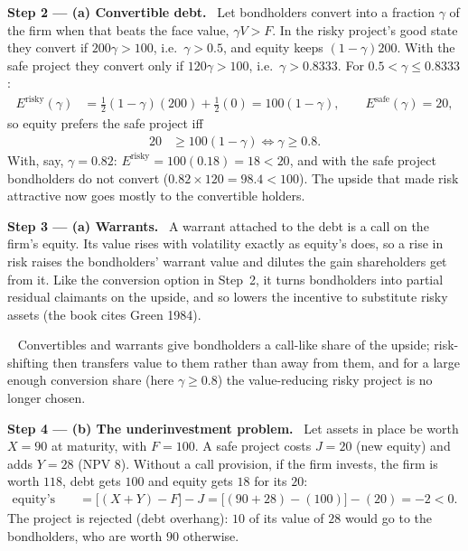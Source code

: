 \documentclass[11pt,a4paper]{article}
\newcommand{\step}[2]{\par\medskip\noindent\textbf{Step #1 --- #2.}~}
\newcommand{\answer}[1]{\par\smallskip\noindent\fbox{\textbf{Answer #1.}}~}
\begin{document}
\step{2}{(a) Convertible debt} Let bondholders convert into a fraction $\gamma$ of the firm when that beats the face value, $\gamma V>F$. In the risky project's good state they convert if $200\gamma>100$, i.e.\ $\gamma>0.5$, and equity keeps $(1-\gamma)200$. With the safe project they convert only if $120\gamma>100$, i.e.\ $\gamma>0.8333$. For $0.5<\gamma\le 0.8333$:
\begin{align}
  E^{\text{risky}}(\gamma) &= \tfrac12(1-\gamma)(200) + \tfrac12(0) = 100(1-\gamma), \qquad E^{\text{safe}}(\gamma) = 20, \nonumber
\end{align}
so equity prefers the safe project iff
\begin{align}
  20 &\ge 100(1-\gamma) \iff \gamma \ge 0.8. \label{r7e3-gamma}
\end{align}
With, say, $\gamma=0.82$: $E^{\text{risky}}=100(0.18)=18<20$, and with the safe project bondholders do not convert ($0.82\times120=98.4<100$). The upside that made risk attractive now goes mostly to the convertible holders.

\step{3}{(a) Warrants} A warrant attached to the debt is a call on the firm's equity. Its value rises with volatility exactly as equity's does, so a rise in risk raises the bondholders' warrant value and dilutes the gain shareholders get from it. Like the conversion option in Step~2, it turns bondholders into partial residual claimants on the upside, and so lowers the incentive to substitute risky assets (the book cites Green 1984).
\answer{(a)} Convertibles and warrants give bondholders a call-like share of the upside; risk-shifting then transfers value to them rather than away from them, and for a large enough conversion share (here $\gamma\ge0.8$) the value-reducing risky project is no longer chosen.

\step{4}{(b) The underinvestment problem} Let assets in place be worth $X=90$ at maturity, with $F=100$. A safe project costs $J=20$ (new equity) and adds $Y=28$ (NPV $8$). Without a call provision, if the firm invests, the firm is worth $118$, debt gets $100$ and equity gets $18$ for its $20$:
\begin{align}
  \text{equity's NPV} &= \bigl[(X+Y)-F\bigr] - J = \bigl[(90+28)-(100)\bigr] - (20) = -2 < 0. \nonumber
\end{align}
The project is rejected (debt overhang): $10$ of its value of $28$ would go to the bondholders, who are worth $90$ otherwise.
\end{document}
